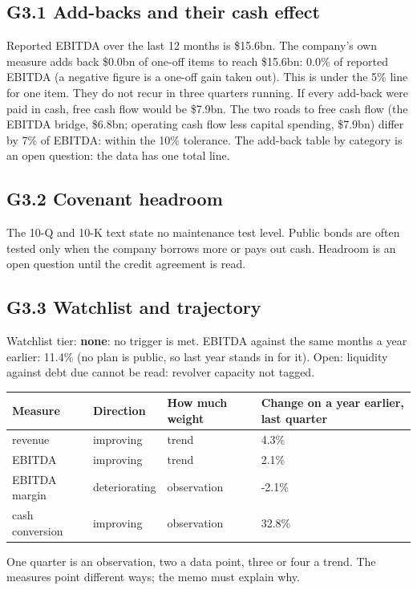 \documentclass[11pt,a4paper]{article}
\begin{document}
\subsection*{G3.1 Add-backs and their cash effect}
Reported EBITDA over the last 12 months is \$15.6bn. The company's own measure adds back \$0.0bn of one-off items to reach \$15.6bn: 0.0\% of reported EBITDA (a negative figure is a one-off gain taken out). This is under the 5\% line for one item. They do not recur in three quarters running. If every add-back were paid in cash, free cash flow would be \$7.9bn. The two roads to free cash flow (the EBITDA bridge, \$6.8bn; operating cash flow less capital spending, \$7.9bn) differ by 7\% of EBITDA: within the 10\% tolerance. The add-back table by category is an open question: the data has one total line.
\subsection*{G3.2 Covenant headroom}
The 10-Q and 10-K text state no maintenance test level. Public bonds are often tested only when the company borrows more or pays out cash. Headroom is an open question until the credit agreement is read.
\subsection*{G3.3 Watchlist and trajectory}
Watchlist tier: \textbf{none}: no trigger is met. EBITDA against the same months a year earlier: 11.4\% (no plan is public, so last year stands in for it). Open: liquidity against debt due cannot be read: revolver capacity not tagged.
\begin{center}\footnotesize\setlength{\tabcolsep}{3.5pt}\begin{tabular}{@{}llll@{}}\toprule
Measure & Direction & How much weight & Change on a year earlier, last quarter \\\midrule
revenue & improving & trend & 4.3\% \\
EBITDA & improving & trend & 2.1\% \\
EBITDA margin & deteriorating & observation & -2.1\% \\
cash conversion & improving & observation & 32.8\% \\
\bottomrule\end{tabular}\end{center}
One quarter is an observation, two a data point, three or four a trend. The measures point different ways; the memo must explain why.
\end{document}

